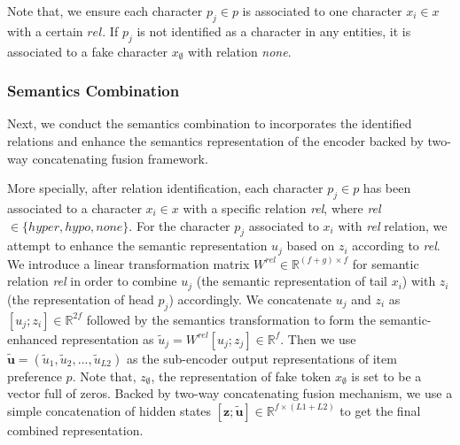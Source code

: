 Note that, we ensure each character $p_j \in p$ is associated to one 
character $x_i \in x$ with a certain $rel$. 
If $p_j$ is not identified as a character in any entities, 
it is associated to a fake character $x_{\emptyset}$ with relation \emph{none}.





\subsubsection{Semantics Combination}
\label{sec:combination}
Next, we conduct the semantics combination
to incorporates the identified relations
and enhance the semantics representation
of the encoder backed by two-way concatenating fusion framework.

More specially, after relation identification, 
each character $p_j \in p$ has been associated to 
a character $x_i \in x$ with a specific relation \emph{rel},
where \emph{rel} $\in \{ hyper, hypo, none\}$.
For the character $p_j$ associated to $x_i$ with \emph{rel} relation,
we attempt to enhance the semantic representation $u_j$ 
based on $z_i$ according to \emph{rel}.
We introduce a linear transformation matrix $W^{rel} \in \mathbb{ R }^{(f+g) \times f}$ for semantic relation \emph{rel}
in order to combine  $u_j$ (the semantic representation of tail $x_i$) with 
$z_i$ (the representation of head $p_j$) accordingly.
We concatenate $u_j$ and $z_i$ as $[u_j; z_i] \in \mathbb{ R }^{2f}$ followed by 
the semantics transformation 
to form the semantic-enhanced representation
as $\tilde{u}_j = W^{rel}[u_j ; z_j] \in \mathbb{ R }^{f}$.
Then we use $\tilde{\textbf{u}} = (\tilde{u}_1, \tilde{u}_2, ..., \tilde{u}_{L2})$
as the sub-encoder output representations of item preference $p$.
Note that, $z_{\emptyset}$, the representation of fake token $x_{\emptyset}$ is set to be a vector full of zeros.
Backed by two-way concatenating fusion mechanism, 
we use a simple concatenation of hidden states $[\textbf{z}; \tilde{\textbf{u}}] \in \mathbb{ R }^{f\times (L1+L2)}$ to get the final combined representation.





